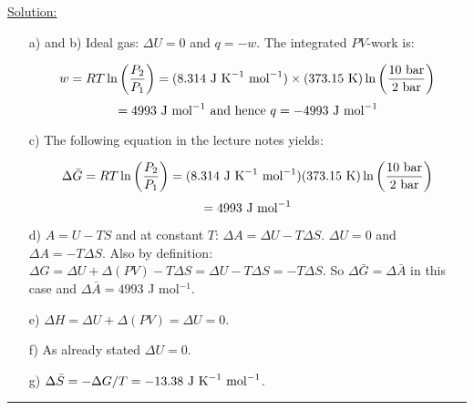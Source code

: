 \noindent
\underline{Solution:}\\

\begin{itemize}

\item[a) and b)] Ideal gas: $\Delta U = 0$ and $q = -w$. The integrated $PV$-work is:

$$w = RT\ln\left(\frac{P_2}{P_1}\right) = (8.314\textnormal{ J K}^{-1}\textnormal{ mol}^{-1})\times (373.15\textnormal{ K})\ln\left(\frac{10\textnormal{ bar}}{2\textnormal{ bar}}\right)$$
$$ = 4993\textnormal{ J mol}^{-1}\textnormal{ and hence }q = -4993\textnormal{ J mol}^{-1}$$

\item[c)] The following equation in the lecture notes yields:

$$\Delta \bar{G} = RT\ln\left(\frac{P_2}{P_1}\right) = (8.314\textnormal{ J K}^{-1}\textnormal{ mol}^{-1})(373.15\textnormal{ K})\ln\left(\frac{10\textnormal{ bar}}{2\textnormal{ bar}}\right)$$
$$ = 4993\textnormal{ J mol}^{-1}$$

\item[d)] $A = U - TS$ and at constant $T$: $\Delta A = \Delta U - T\Delta S$. $\Delta U = 0$ and $\Delta A = -T\Delta S$. Also by definition: $\Delta G = \Delta U + \Delta(PV) - T\Delta S = \Delta U - T\Delta S = -T\Delta S$. So $\Delta\bar{G} = \Delta\bar{A}$ in this case and $\Delta \bar{A} = 4993$ J mol$^{-1}$.

\item[e)] $\Delta H = \Delta U + \Delta(PV) = \Delta U = 0$.

\item[f)] As already stated $\Delta U = 0$.

\item[g)] $\Delta\bar{S} = -\Delta G / T = -13.38\textnormal{ J K}^{-1}\textnormal{ mol}^{-1}$.

\end{itemize}

\hrule\vspace{0.5cm}
